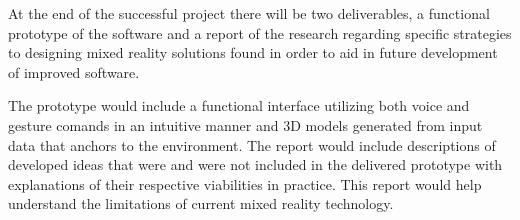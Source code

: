 \documentclass[10pt,draftclsnofoot,onecolumn]{IEEEtran}
\begin{document}
	At the end of the successful project there will be two deliverables, a
	functional prototype of the software and a report of the research regarding
	specific strategies to designing mixed reality solutions found in order
	to aid in future development of improved software.

	The prototype would include a functional interface utilizing both voice and
	gesture comands in an intuitive manner and 3D models generated from input
	data that anchors to the environment.
	The report would include descriptions of developed ideas that were and were
	not included in the delivered prototype with explanations of their
	respective viabilities in practice. This report would help understand the
	limitations of current mixed reality technology.

	\newpage
{}

\end{document}
